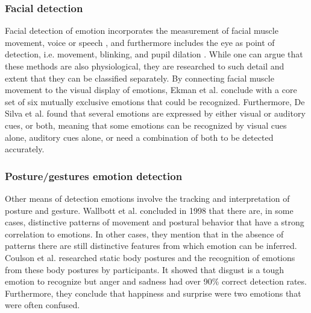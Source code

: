 \documentclass{sigchi}
\begin{document}
\subsubsection{Facial detection} %
\label{sub:facial_detection}
Facial detection of emotion incorporates the measurement of facial muscle movement, voice or speech \cite{Ververidis2004}, and furthermore includes the eye as point of detection, i.e. movement, blinking, and pupil dilation \cite{Soleymani2015}. While one can argue that these methods are also physiological, they are researched to such detail and extent that they can be classified separately. By connecting facial muscle movement to the visual display of emotions, Ekman et al. \cite{Ekman1969} conclude with a core set of six mutually exclusive emotions that could be recognized. Furthermore, De Silva et al. \cite{Silva1997} found that several emotions are expressed by either visual or auditory cues, or both, meaning that some emotions can be recognized by visual cues alone, auditory cues alone, or need a combination of both to be detected accurately.

\subsubsection{Posture/gestures emotion detection}
Other means of detection emotions involve the tracking and interpretation of posture and gesture. Wallbott et al. \cite{Wallbott1998} concluded in 1998 that there are, in some cases, distinctive patterns of movement and postural behavior that have a strong correlation to emotions. In other cases, they mention that in the absence of patterns there are still distinctive features from which emotion can be inferred. Coulson et al. \cite{Coulson2004} researched static body postures and the recognition of emotions from these body postures by participants. It showed that disgust is a tough emotion to recognize but anger and sadness had over 90\% correct detection rates. Furthermore, they conclude that happiness and surprise were two emotions that were often confused. 
\end{document}
